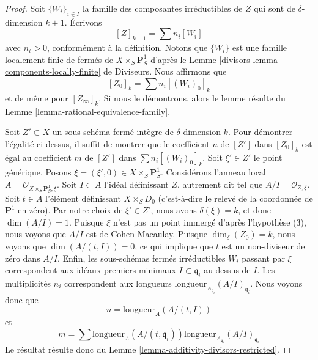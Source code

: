 \begin{proof}
Soit $\{W_i\}_{i \in I}$ la famille des composantes
irréductibles de $Z$ qui sont de $\delta$-dimension $k + 1$.
Écrivons
$$
[Z]_{k + 1} = \sum n_i[W_i]
$$
avec $n_i > 0$, conformément à la définition. Notons que $\{W_i\}$
est une famille localement finie de fermés de
$X \times_S \mathbf{P}^1_S$ d'après le
Lemme \ref{divisors-lemma-components-locally-finite} de Diviseurs.
Nous affirmons que
$$
[Z_0]_k = \sum n_i[(W_i)_0]_k
$$
et de même pour $[Z_\infty]_k$. Si nous le démontrons, alors le lemme
résulte du Lemme \ref{lemma-rational-equivalence-family}.

\medskip\noindent
Soit $Z' \subset X$ un sous-schéma fermé intègre de $\delta$-dimension $k$.
Pour démontrer l'égalité ci-dessus, il suffit de montrer que le coefficient $n$
de $[Z']$ dans $[Z_0]_k$ est égal au coefficient $m$ de
$[Z']$ dans $\sum n_i[(W_i)_0]_k$. Soit $\xi' \in Z'$ le point générique.
Posons $\xi = (\xi', 0) \in  X \times_S \mathbf{P}^1_S$.
Considérons l'anneau local $A = \mathcal{O}_{X \times_S \mathbf{P}^1_S, \xi}$.
Soit $I \subset A$ l'idéal définissant $Z$, autrement dit tel que
$A/I = \mathcal{O}_{Z, \xi}$. Soit $t \in A$ l'élément définissant
$X \times_S D_0$ (c'est-à-dire le relevé de la coordonnée de $\mathbf{P}^1$ en zéro).
Par notre choix de $\xi' \in Z'$, nous avons $\delta(\xi) = k$,
et donc $\dim(A/I) = 1$. Puisque $\xi$ n'est pas un point immergé d'après
l'hypothèse (3), nous voyons que $A/I$ est de Cohen-Macaulay. Puisque $\dim_\delta(Z_0)
= k$, nous voyons que $\dim(A/(t, I)) = 0$, ce qui implique que $t$
est un non-diviseur de zéro dans $A/I$. Enfin, les sous-schémas fermés irréductibles
$W_i$ passant par $\xi$ correspondent aux idéaux premiers minimaux
$I \subset \mathfrak q_i$ au-dessus de $I$. Les multiplicités $n_i$ correspondent
aux longueurs $\text{longueur}_{A_{\mathfrak q_i}}(A/I)_{\mathfrak q_i}$.
Nous voyons donc que
$$
n = \text{longueur}_A(A/(t, I))
$$
et
$$
m = \sum
\text{longueur}_A(A/(t, \mathfrak q_i))
\text{longueur}_{A_{\mathfrak q_i}}(A/I)_{\mathfrak q_i}
$$
Le résultat résulte donc du
Lemme \ref{lemma-additivity-divisors-restricted}.
\end{proof}

